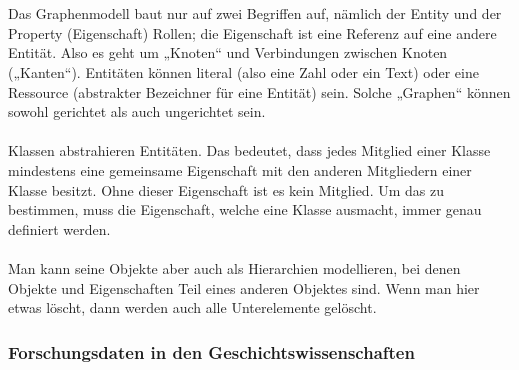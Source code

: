 \documentclass[12pt,a4paper]{article}
\begin{document}
\\
\\
Das Graphenmodell baut nur auf zwei Begriffen auf, nämlich der Entity und der Property (Eigenschaft) Rollen; die Eigenschaft ist eine Referenz auf eine andere Entität. Also es geht um „Knoten“ und Verbindungen zwischen Knoten („Kanten“). Entitäten können literal (also eine Zahl oder ein Text) oder eine Ressource (abstrakter Bezeichner für eine Entität) sein. Solche „Graphen“ können sowohl gerichtet als auch ungerichtet sein.
\\
\\
Klassen abstrahieren Entitäten. Das bedeutet, dass jedes Mitglied einer Klasse mindestens eine gemeinsame Eigenschaft mit den anderen Mitgliedern einer Klasse besitzt. Ohne dieser Eigenschaft ist es kein Mitglied. Um das zu bestimmen, muss die Eigenschaft, welche eine Klasse ausmacht, immer genau definiert werden.
\\
\\
Man kann seine Objekte aber auch als Hierarchien modellieren, bei denen Objekte und Eigenschaften Teil eines anderen Objektes sind. Wenn man hier etwas löscht, dann werden auch alle Unterelemente gelöscht.


\subsubsection{Forschungsdaten in den Geschichtswissenschaften}
\end{document}
